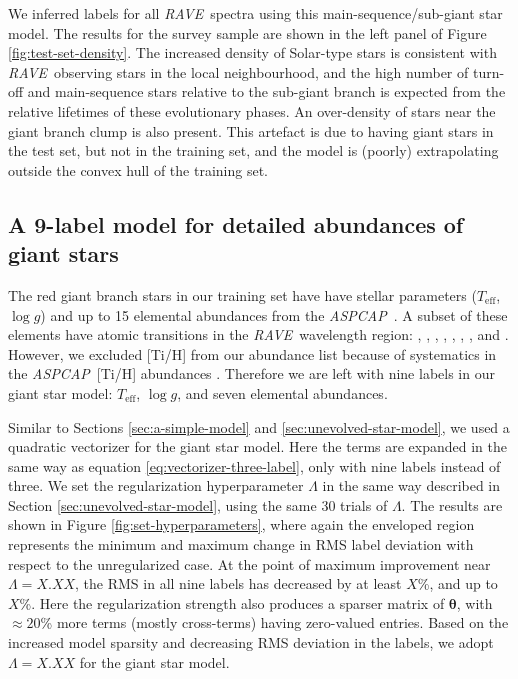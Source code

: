 \documentclass[preprint,trackchanges]{aastex}
\newcommand{\acronym}[1]{{\small{#1}}}
\newcommand{\project}[1]{\textsl{#1}}
\newcommand{\rave}{\project{\acronym{RAVE}}}
\newcommand{\aspcap}{\project{\acronym{ASPCAP}}}
\newcommand{\teff}{T_{\mathrm{eff}}}
\newcommand{\logg}{\log g}
\newcommand{\Dvector}[1]{\boldsymbol{#1}}
\newcommand{\vectheta}{\Dvector{\theta}}
\begin{document}
We inferred labels for all \rave\ spectra using this main-sequence/sub-giant star model.  
The results for the survey sample are shown in the left panel of Figure \ref{fig:test-set-density}.  
The increased density of Solar-type stars is consistent with \rave\
observing stars in the local neighbourhood, and the high number of turn-off
and main-sequence stars relative to the sub-giant branch is expected from 
the relative lifetimes of these evolutionary phases.  An over-density
of stars near the giant branch clump is also present.  This artefact is due 
to having giant stars in the test set, but not in the training set, and the
model is (poorly) extrapolating outside the convex hull of the training set.


\subsection{A 9-label model for detailed abundances of giant stars}
\label{sec:evolved-star-model}

The red giant branch stars in our training set have have stellar parameters 
($\teff$, $\logg$) and up to 15 elemental abundances from the \aspcap\ 
\citep{Garcia_Perez_2016}.  A subset of these elements have atomic transitions in the 
\rave\ wavelength region: \ion{O}{1}, \ion{Mg}{1}, \ion{Al}{1}, , 
\ion{Ca}{2}, \ion{Ti}{1}, \ion{Fe}{1}, and \ion{Ni}{1}.  However, we 
excluded [Ti/H] from our abundance list because of systematics in the \aspcap\
[Ti/H] abundances \citep{Holtzman_2015,Hawkins_2016}.  Therefore we are left 
with nine labels in our giant star model: $\teff$, $\logg$, and seven elemental 
abundances.  


Similar to Sections \ref{sec:a-simple-model} and \ref{sec:unevolved-star-model},
we used a quadratic vectorizer for the giant star model.  Here the terms are 
expanded in the same way as equation \ref{eq:vectorizer-three-label}, only
with nine labels instead of three.  We set the regularization hyperparameter $\Lambda$
in the same way described in Section \ref{sec:unevolved-star-model}, using the same 30 trials of $\Lambda$.
The results are shown in Figure \ref{fig:set-hyperparameters}, where
again the enveloped region represents the minimum and maximum change in RMS label
deviation with respect to the unregularized case.  At the point of maximum improvement 
near $\Lambda = X.XX$, the RMS in all nine labels has decreased by at least $X$\%, 
and up to $X$\%.  Here the regularization strength also produces a sparser matrix
of $\vectheta$, with $\approx20$\% more terms (mostly cross-terms) having zero-valued entries.
Based on the increased model sparsity and decreasing RMS deviation in the labels, 
we adopt $\Lambda = X.XX$ for the giant star model.
\end{document}
